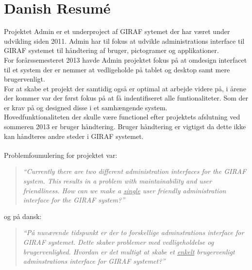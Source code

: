\chapter*{Danish Resumé}
Projektet Admin er et underproject af GIRAF sytemet der har været under udvikling siden 2011. Admin har til fokus at udvikle administrations interface til GIRAF systemet til håndtering af bruger, pictogramer og applikationer.\\
For forårssemesteret 2013 havde Admin projektet fokus på at omdesign interfacet til et system der er nemmer at vedligeholde på tablet og desktop samt mere brugervenligt.\\
For at skabe et projekt der samtidig også er optimal at arbejde videre på, i årene der kommer var der først fokus på at få indentifiseret alle funtionaliteter. Som der er krav på og designed disse i et samhængende system.\\
Hovedfunktionaliteten der skulle være functionel efter projektets afslutning ved sommeren 2013 er bruger håndtering.   
Bruger håndtering er vigtigst da dette ikke kan håndteres andre steder i GIRAF systemet.\\
\\
Problemfoumulering for projektet var: 
\begin{verse}
\textit{``Currently there are two different administration interfaces for the GIRAF system.
This results in a problem with maintainability and user friendliness.
How can we make a \underline{single} user friendly administration interface for the GIRAF system?''}
\end{verse}

og på dansk: 
\begin{verse}
\textit{``På nuværende tidspunkt er der to forskellige adminstrations interface for GIRAF systemet.
Dette skaber problemer med vedligeholdelse og brugervenlighed. 
Hvordan er det multigt at skabe et \underline{enkelt} brugervenligt adminstrations interface for GIRAF systemet?''}
\end{verse}


